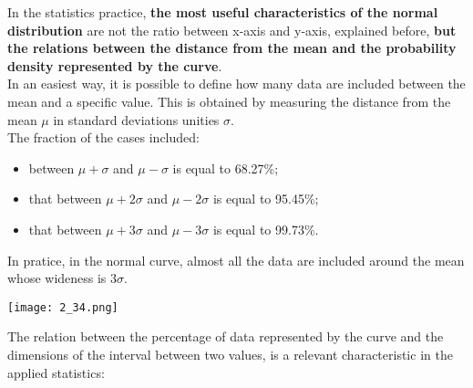
\begin{frame}
  \begin{small}
    \vspace*{.2cm}
    In the statistics practice, \textbf{the most useful characteristics of the normal distribution} are not the ratio between x-axis and y-axis, explained before, \textbf{but the relations between the distance from the mean and the probability density represented by the curve}.\\
    \vspace*{.2cm}
    In an easiest way, it is possible to define how many data are included between the mean and a specific value. This is obtained by measuring the distance from the mean {\boldmath$\mu$} in standard deviations unities {\boldmath$\sigma$}.\\
    \vspace*{.2cm}
    The fraction of the cases included:
    \begin{itemize}
      \item between $ \mu + \sigma $ and $ \mu - \sigma $ is equal to 68.27\%;
      \item that between $ \mu + 2 \sigma $ and $ \mu - 2 \sigma $ is equal to 95.45\%;
      \item that between $ \mu + 3 \sigma $ and $ \mu - 3 \sigma $ is equal to 99.73\%.
    \end{itemize}
    \vspace*{.2cm}
    In pratice, in the normal curve, almost all the data are included around the mean whose wideness is {\boldmath $ 3\sigma $}.
  \end{small}
\end{frame}

\begin{frame}
  \vspace*{.5cm}
  \begin{floatingfigure}[r]{8.5cm}
    \texttt{[image: 2\_34.png]} 
  \end{floatingfigure}
  The relation between the percentage of data represented by the curve and the dimensions of the interval between two values, is a relevant characteristic in the applied statistics:\\
\end{frame}


